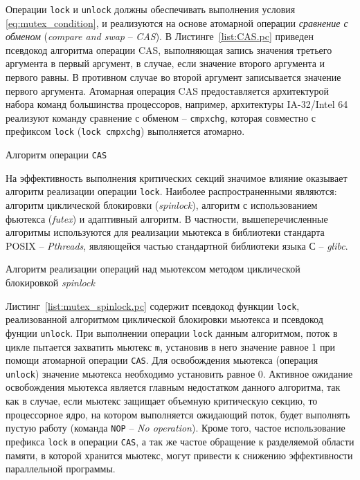 Операции \texttt{lock} и \texttt{unlock} должны обеспечивать выполнения условия \ref{eq:mutex_condition}, и реализуются на основе атомарной операции \textit{сравнение с обменом} (\textit{compare and swap} -- \textit{CAS}). В Листинге~\ref{list:CAS.pc} приведен псевдокод алгоритма операции CAS, выполняющая запись значения третьего аргумента в первый аргумент, в случае, если значение второго аргумента и первого равны. В противном случае во второй аргумент записывается значение первого аргумента. Атомарная операция CAS предоставляется архитектурой набора команд большинства процессоров, например, архитектуры IA-32/Intel 64 реализуют команду сравнение с обменом -- \texttt{cmpxchg}, которая совместно с префиксом \texttt{lock} (\texttt{lock cmpxchg}) выполняется атомарно.

\begin{algorithm}[!h]
	
    \caption{Алгоритм операции \texttt{CAS}}
    \label{list:CAS.pc}
\end{algorithm}

На эффективность выполнения критических секций значимое влияние оказывает алгоритм реализации операции \texttt{lock}. Наиболее распространенными являются: алгоритм циклической блокировки (\textit{spinlock}), алгоритм с использованием фьютекса (\textit{futex}) и адаптивный алгоритм. В частности, вышеперечисленные алгоритмы используются для реализации мьютекса в библиотеки стандарта  POSIX -- \textit{Pthreads}, являющейся частью стандартной библиотеки языка С -- \textit{glibc}.

\begin{algorithm}[!h]
	
    \caption{Алгоритм реализации операций над мьютексом методом циклической блокировкой \textit{spinlock}}
    \label{list:mutex_spinlock.pc}
\end{algorithm}

Листинг~\ref{list:mutex_spinlock.pc} содержит псевдокод функции \texttt{lock}, реализованной алгоритмом циклической блокировки мьютекса и псевдокод фунции \texttt{unlock}. При выполнении операции \texttt{lock} данным алгоритмом, поток в цикле пытается захватить мьютекс \texttt{m}, установив в него значение равное 1 при помощи атомарной операции \texttt{CAS}. Для освобождения мьютекса (операция \texttt{unlock}) значение мьютекса необходимо установить равное 0. Активное ожидание освобождения мьютекса является главным недостатком данного алгоритма, так как в случае, если мьютекс защищает объемную критическую секцию, то процессорное ядро, на котором выполняется ожидающий поток, будет выполнять пустую работу (команда \texttt{NOP} -- \textit{No operation}). Кроме того, частое использование префикса \texttt{lock} в операции \texttt{CAS}, а так же частое обращение к разделяемой области памяти, в которой хранится мьютекс, могут привести к снижению эффективности параллельной программы.


